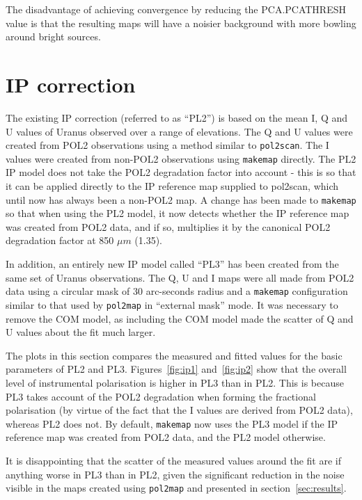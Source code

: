 \documentclass[twoside,11pt]{starlink}
\begin{document}
The disadvantage of achieving convergence by reducing the PCA.PCATHRESH
value is that the resulting maps will have a noisier background with more
bowling around bright sources.

\section{IP correction}
The existing IP correction (referred to as ``PL2'') is based on the mean I, Q
and U values of Uranus observed over a range of elevations. The Q and U
values were created from POL2 observations using a method similar to
\texttt{pol2scan}. The I values were created from non-POL2 observations
using \texttt{makemap} directly. The PL2 IP model does not take the POL2
degradation factor into account - this is so that it can be applied
directly to the IP reference map supplied to pol2scan, which until now
has always been a non-POL2 map. A change has been made to
\texttt{makemap} so that when using the PL2 model, it now detects whether
the IP reference map was created from POL2 data, and if so, multiplies it
by the canonical POL2 degradation factor at 850 $\mu m$ (1.35).

In addition, an entirely new IP model called ``PL3'' has been created
from the same set of Uranus observations. The Q, U and I maps were all
made from POL2 data using a circular mask of 30 arc-seconds radius and a
\texttt{makemap} configuration similar to that used by \texttt{pol2map}
in ``external mask'' mode. It was necessary to remove the COM model, as
including the COM model made the scatter of Q and U values about the fit
much larger.

The plots in this section compares the measured and fitted values for the
basic parameters of PL2 and PL3. Figures~\ref{fig:ip1} and~\ref{fig:ip2}
show that the overall level of instrumental polarisation is higher in PL3
than in PL2. This is because PL3 takes account of the POL2 degradation
when forming the fractional polarisation (by virtue of the fact that the
I values are derived from POL2 data), whereas PL2 does not. By default,
\texttt{makemap} now uses the PL3 model if the IP reference map was
created from POL2 data, and the PL2 model otherwise.

It is disappointing that the scatter of the measured values around the
fit are if anything worse in PL3 than in PL2, given the significant
reduction in the noise visible in the maps created using \texttt{pol2map}
and presented in section~\ref{sec:results}.
\end{document}

